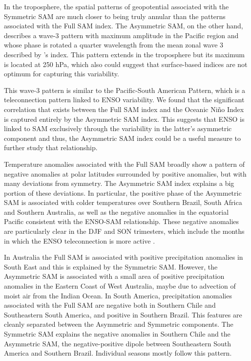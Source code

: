 \documentclass[]{ametsocV5}
\begin{document}
In the troposphere, the spatial patterns of geopotential associated with the Symmetric SAM are much closer to being truly annular than the patterns associated with the Full SAM index. The Asymmetric SAM, on the other hand, describes a wave-3 pattern with maximum amplitude in the Pacific region and whose phase is rotated a quarter wavelength from the mean zonal wave 3 described by \citet{raphael2004}'s index. This pattern extends in the troposphere but its maximum is located at 250 hPa, which also could suggest that surface-based indices are not optimum for capturing this variability.

This wave-3 pattern is similar to the Pacific-South American Pattern, which is a teleconnection pattern linked to ENSO variability. We found that the significant correlation that exists between the Full SAM index and the Oceanic Niño Index is captured entirely by the Asymmetric SAM index. This suggests that ENSO is linked to SAM exclusively through the variability in the latter's asymmetric component and thus, the Asymmetric SAM index could be a useful measure to further study that relationship.

Temperature anomalies associated with the Full SAM broadly show a pattern of negative anomalies at polar latitudes surrounded by positive anomalies, but with many deviations from symmetry. The Asymmetric SAM index explains a big portion of these deviations. In particular, the positive phase of the Asymmetric SAM is associated with colder temperatures over Southern Brazil, South Africa and Southern Australia, as well as the negative anomalies in the equatorial Pacific consistent with the ENSO-SAM relationship. These negative anomalies are particularly clear in the DJF and SON trimesters, which include the months in which the ENSO teleconnection is more active \citep{cazes-boezio2003, fogt2011, cai2020a}.

In Australia the Full SAM is associated with positive precipitation anomalies in South East and this is explained by the Symmetric SAM. However, the Asymmetric SAM is associated with a small area of positive precipitation anomalies in the Eastern Coast of West Australia, maybe due to advection of moist air from the Indian Ocean. In South America, precipitation anomalies associated with the Full SAM are negative both in Southern Chile and Southeastern South America, and positive in Southern Brazil. This features are cleanly separated between the Asymmetric and Symmetric components. The Symmetric SAM explains the negative anomalies in Southern Chile and the Asymmetric SAM, the negative-positive dipole between Southeastern South America and Southern Brazil. Individual seasons mostly follow this pattern.
\end{document}
